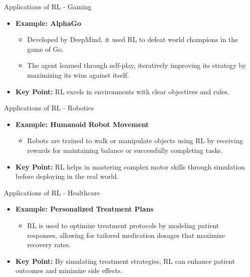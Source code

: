 \documentclass[aspectratio=169]{beamer}
\begin{document}
\begin{frame}{Applications of RL - Gaming}
    \begin{itemize}
        \item \textbf{Example: AlphaGo}
            \begin{itemize}
                \item Developed by DeepMind, it used RL to defeat world champions in the game of Go.
                \item The agent learned through self-play, iteratively improving its strategy by maximizing its wins against itself.
            \end{itemize}
        \item \textbf{Key Point:} RL excels in environments with clear objectives and rules.
    \end{itemize}
\end{frame}

\begin{frame}{Applications of RL - Robotics}
    \begin{itemize}
        \item \textbf{Example: Humanoid Robot Movement}
            \begin{itemize}
                \item Robots are trained to walk or manipulate objects using RL by receiving rewards for maintaining balance or successfully completing tasks.
            \end{itemize}
        \item \textbf{Key Point:} RL helps in mastering complex motor skills through simulation before deploying in the real world.
    \end{itemize}
\end{frame}

\begin{frame}{Applications of RL - Healthcare}
    \begin{itemize}
        \item \textbf{Example: Personalized Treatment Plans}
            \begin{itemize}
                \item RL is used to optimize treatment protocols by modeling patient responses, allowing for tailored medication dosages that maximize recovery rates.
            \end{itemize}
        \item \textbf{Key Point:} By simulating treatment strategies, RL can enhance patient outcomes and minimize side effects.
    \end{itemize}
\end{frame}
\end{document}
